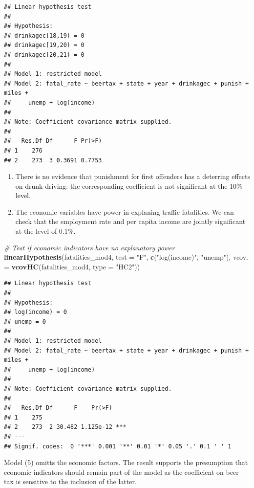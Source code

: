 \documentclass[]{book}
\newenvironment{Shaded}{\begin{snugshade}}{\end{snugshade}}
\newcommand{\KeywordTok}[1]{\textcolor[rgb]{0.13,0.29,0.53}{\textbf{#1}}}
\newcommand{\DataTypeTok}[1]{\textcolor[rgb]{0.13,0.29,0.53}{#1}}
\newcommand{\StringTok}[1]{\textcolor[rgb]{0.31,0.60,0.02}{#1}}
\newcommand{\CommentTok}[1]{\textcolor[rgb]{0.56,0.35,0.01}{\textit{#1}}}
\newcommand{\NormalTok}[1]{#1}
\theoremstyle{definition}
\theoremstyle{definition}
\theoremstyle{definition}
\theoremstyle{remark}
\begin{document}
\begin{verbatim}
## Linear hypothesis test
## 
## Hypothesis:
## drinkagec[18,19) = 0
## drinkagec[19,20) = 0
## drinkagec[20,21) = 0
## 
## Model 1: restricted model
## Model 2: fatal_rate ~ beertax + state + year + drinkagec + punish + miles + 
##     unemp + log(income)
## 
## Note: Coefficient covariance matrix supplied.
## 
##   Res.Df Df      F Pr(>F)
## 1    276                 
## 2    273  3 0.3691 0.7753
\end{verbatim}

\begin{enumerate}
\def\labelenumi{\arabic{enumi}.}
\setcounter{enumi}{2}
\item
  There is no evidence that punishment for first offenders has a
  deterring effects on drunk driving: the corresponding coefficient is
  not significant at the \(10\%\) level.
\item
  The economic variables have power in explaning traffic fatalities. We
  can check that the employment rate and per capita income are jointly
  significant at the level of \(0.1\%\).
\end{enumerate}

\begin{Shaded}
\begin{Highlighting}[]
\CommentTok{# Test if economic indicators have no explanatory power}
\KeywordTok{linearHypothesis}\NormalTok{(fatalities_mod4, }
                 \DataTypeTok{test =} \StringTok{"F"}\NormalTok{,}
                 \KeywordTok{c}\NormalTok{(}\StringTok{"log(income)"}\NormalTok{, }\StringTok{"unemp"}\NormalTok{), }
                 \DataTypeTok{vcov. =} \KeywordTok{vcovHC}\NormalTok{(fatalities_mod4, }\DataTypeTok{type =} \StringTok{"HC2"}\NormalTok{))}
\end{Highlighting}
\end{Shaded}

\begin{verbatim}
## Linear hypothesis test
## 
## Hypothesis:
## log(income) = 0
## unemp = 0
## 
## Model 1: restricted model
## Model 2: fatal_rate ~ beertax + state + year + drinkagec + punish + miles + 
##     unemp + log(income)
## 
## Note: Coefficient covariance matrix supplied.
## 
##   Res.Df Df      F    Pr(>F)    
## 1    275                        
## 2    273  2 30.482 1.125e-12 ***
## ---
## Signif. codes:  0 '***' 0.001 '**' 0.01 '*' 0.05 '.' 0.1 ' ' 1
\end{verbatim}

Model (5) omitts the economic factors. The result supports the
presumption that economic indicators should remain part of the model as
the coefficient on beer tax is sensitive to the inclusion of the latter.
\end{document}
